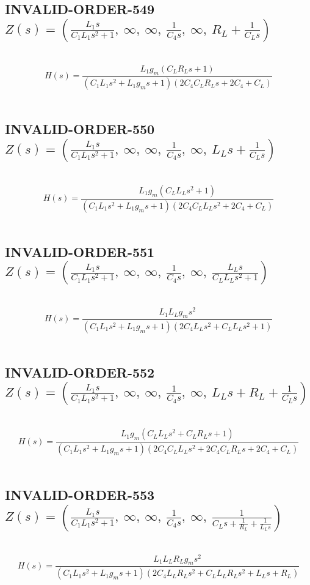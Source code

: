 \documentclass{article}
\begin{document}
\subsection{INVALID-ORDER-549 $Z(s) = \left( \frac{L_{1} s}{C_{1} L_{1} s^{2} + 1}, \  \infty, \  \infty, \  \frac{1}{C_{4} s}, \  \infty, \  R_{L} + \frac{1}{C_{L} s}\right)$ } \ 
\textbf{\[H(s) = \frac{L_{1} g_{m} \left(C_{L} R_{L} s + 1\right)}{\left(C_{1} L_{1} s^{2} + L_{1} g_{m} s + 1\right) \left(2 C_{4} C_{L} R_{L} s + 2 C_{4} + C_{L}\right)}\] } \ 
\subsection{INVALID-ORDER-550 $Z(s) = \left( \frac{L_{1} s}{C_{1} L_{1} s^{2} + 1}, \  \infty, \  \infty, \  \frac{1}{C_{4} s}, \  \infty, \  L_{L} s + \frac{1}{C_{L} s}\right)$ } \ 
\textbf{\[H(s) = \frac{L_{1} g_{m} \left(C_{L} L_{L} s^{2} + 1\right)}{\left(C_{1} L_{1} s^{2} + L_{1} g_{m} s + 1\right) \left(2 C_{4} C_{L} L_{L} s^{2} + 2 C_{4} + C_{L}\right)}\] } \ 
\subsection{INVALID-ORDER-551 $Z(s) = \left( \frac{L_{1} s}{C_{1} L_{1} s^{2} + 1}, \  \infty, \  \infty, \  \frac{1}{C_{4} s}, \  \infty, \  \frac{L_{L} s}{C_{L} L_{L} s^{2} + 1}\right)$ } \ 
\textbf{\[H(s) = \frac{L_{1} L_{L} g_{m} s^{2}}{\left(C_{1} L_{1} s^{2} + L_{1} g_{m} s + 1\right) \left(2 C_{4} L_{L} s^{2} + C_{L} L_{L} s^{2} + 1\right)}\] } \ 
\subsection{INVALID-ORDER-552 $Z(s) = \left( \frac{L_{1} s}{C_{1} L_{1} s^{2} + 1}, \  \infty, \  \infty, \  \frac{1}{C_{4} s}, \  \infty, \  L_{L} s + R_{L} + \frac{1}{C_{L} s}\right)$ } \ 
\textbf{\[H(s) = \frac{L_{1} g_{m} \left(C_{L} L_{L} s^{2} + C_{L} R_{L} s + 1\right)}{\left(C_{1} L_{1} s^{2} + L_{1} g_{m} s + 1\right) \left(2 C_{4} C_{L} L_{L} s^{2} + 2 C_{4} C_{L} R_{L} s + 2 C_{4} + C_{L}\right)}\] } \ 
\subsection{INVALID-ORDER-553 $Z(s) = \left( \frac{L_{1} s}{C_{1} L_{1} s^{2} + 1}, \  \infty, \  \infty, \  \frac{1}{C_{4} s}, \  \infty, \  \frac{1}{C_{L} s + \frac{1}{R_{L}} + \frac{1}{L_{L} s}}\right)$ } \ 
\textbf{\[H(s) = \frac{L_{1} L_{L} R_{L} g_{m} s^{2}}{\left(C_{1} L_{1} s^{2} + L_{1} g_{m} s + 1\right) \left(2 C_{4} L_{L} R_{L} s^{2} + C_{L} L_{L} R_{L} s^{2} + L_{L} s + R_{L}\right)}\] } \ 
\end{document}
